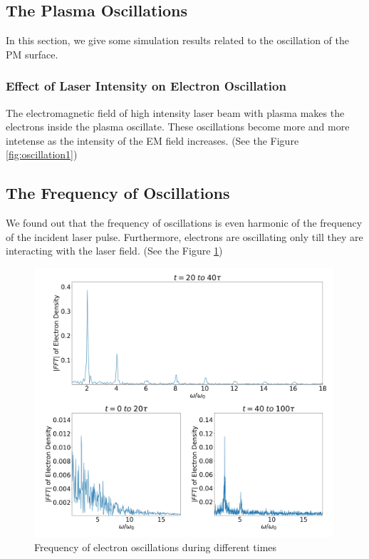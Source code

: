 \documentclass[12pt]{article}
\newenvironment{changemargin}[2]{
\begin{list}{}{
\setlength{\topsep}{0pt}
\setlength{\leftmargin}{#1}
\setlength{\rightmargin}{#2}
\setlength{\listparindent}{\parindent}
\setlength{\itemindent}{\parindent}
\setlength{\parsep}{\parskip}
}
\item[]}{\end{list}}
\begin{document}
\begin{changemargin}{-2cm}{-2cm}
    \subsection{The Plasma Oscillations}
    In this section, we give some simulation results related to the oscillation of the PM surface.
    \subsubsection{Effect of Laser Intensity on Electron Oscillation}
    The electromagnetic field of high intensity laser beam with plasma makes the electrons inside the plasma oscillate. These oscillations become more and more intetense as the intensity of the EM field increases. (See the Figure \ref{fig:oscillation1})
    \subsection{The Frequency of Oscillations}
    We found out that the frequency of oscillations is even harmonic of the frequency of the incident laser pulse. Furthermore, electrons are oscillating only till they are interacting with the laser field. (See the Figure \ref{fig:oscillation2})
    \begin{figure}[h]
        \centering
        \includegraphics[width=0.99\textwidth, height=0.9\textwidth]{images/oscillation2.jpg}
        \caption{Frequency of electron oscillations during different times}
        \label{fig:oscillation2}
    \end{figure}


\end{changemargin}
\end{document}
